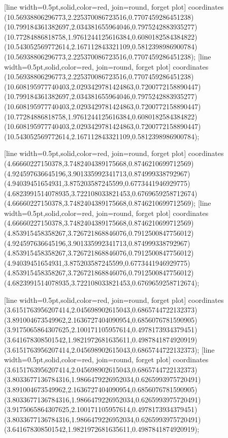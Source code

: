 [line width=0.5pt,solid,color=red, join=round, forget plot] coordinates {(10.56938806296773,2.225370086723516,0.7707459286451238) (10.799184361382697,2.034381655964046,0.7975242883935277) (10.77284886818758,1.9761244125616384,0.6080182584384822) (10.543052569772614,2.167112843321109,0.5812398986900784) (10.56938806296773,2.225370086723516,0.7707459286451238)};
[line width=0.5pt,solid,color=red, join=round, forget plot] coordinates {(10.56938806296773,2.225370086723516,0.7707459286451238) (10.608195977740403,2.0293429781424863,0.7200772158890447) (10.799184361382697,2.034381655964046,0.7975242883935277) (10.608195977740403,2.0293429781424863,0.7200772158890447) (10.77284886818758,1.9761244125616384,0.6080182584384822) (10.608195977740403,2.0293429781424863,0.7200772158890447) (10.543052569772614,2.167112843321109,0.5812398986900784)};

[line width=0.5pt,solid,color=red, join=round, forget plot] coordinates {(4.66660227150378,3.7482404389175668,0.8746210699712569) (4.924597636645196,3.901335992341713,0.874999338792967) (4.94039451654931,3.875203587245599,0.6773441946929775) (4.6823991514078935,3.722108033821453,0.6769659258712674) (4.66660227150378,3.7482404389175668,0.8746210699712569)};
[line width=0.5pt,solid,color=red, join=round, forget plot] coordinates {(4.66660227150378,3.7482404389175668,0.8746210699712569) (4.853915458358267,3.726721868846076,0.7912500847756012) (4.924597636645196,3.901335992341713,0.874999338792967) (4.853915458358267,3.726721868846076,0.7912500847756012) (4.94039451654931,3.875203587245599,0.6773441946929775) (4.853915458358267,3.726721868846076,0.7912500847756012) (4.6823991514078935,3.722108033821453,0.6769659258712674)};

[line width=0.5pt,solid,color=red, join=round, forget plot] coordinates {(3.6151763956207414,2.045698902615043,0.6865744722132373) (3.891004673549962,2.1636727404090954,0.6856076781590905) (3.9175065864307625,2.100171105957614,0.4978173934379451) (3.641678308501542,1.9821972681635611,0.4987841874920919) (3.6151763956207414,2.045698902615043,0.6865744722132373)};
[line width=0.5pt,solid,color=red, join=round, forget plot] coordinates {(3.6151763956207414,2.045698902615043,0.6865744722132373) (3.8033677136784316,1.9866479226952034,0.6265993975720491) (3.891004673549962,2.1636727404090954,0.6856076781590905) (3.8033677136784316,1.9866479226952034,0.6265993975720491) (3.9175065864307625,2.100171105957614,0.4978173934379451) (3.8033677136784316,1.9866479226952034,0.6265993975720491) (3.641678308501542,1.9821972681635611,0.4987841874920919)};


